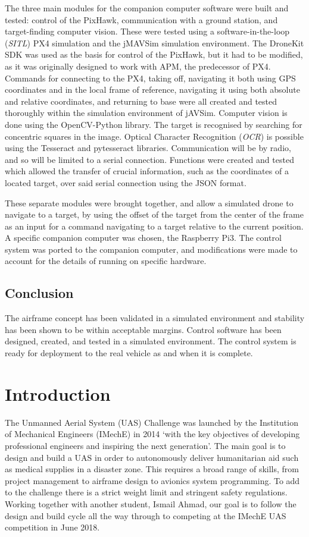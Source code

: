 \documentclass[11pt]{article}
\begin{document}
The three main modules for the companion computer software were built and tested: control of the PixHawk, communication with a ground station, and target-finding computer vision.
These were tested using a software-in-the-loop (\emph{SITL}) PX4 simulation and the jMAVSim simulation environment. The DroneKit SDK was used as the basis for control of the PixHawk, but it had to be modified, as it was originally designed to work with APM, the predecessor of PX4\cite{dronekit}. Commands for connecting to the PX4, taking off, navigating it both using GPS coordinates and in the local frame of reference, navigating it using both absolute and relative coordinates, and returning to base were all created and tested thoroughly within the simulation environment of jAVSim. Computer vision is done using the OpenCV-Python library. The target is recognised by searching for concentric squares in the image. Optical Character Recognition (\emph{OCR}) is possible using the Tesseract and pytesseract libraries. Communication will be by radio, and so will be limited to a serial connection. Functions were created and tested which allowed the transfer of crucial information, such as the coordinates of a located target, over said serial connection using the JSON format.

These separate modules were brought together, and allow a simulated drone to navigate to a target, by using the offset of the target from the center of the frame as an input for a command navigating to a target relative to the current position. A specific companion computer was chosen, the Raspberry Pi3. The control system was ported to the companion computer, and modifications were made to account for the details of running on specific hardware.

\subsection*{Conclusion}
The airframe concept has been validated in a simulated environment and stability has been shown to be within acceptable margins. Control software has been designed, created, and tested in a simulated environment. The control system is ready for deployment to the real vehicle as and when it is complete.


\section{Introduction}
The Unmanned Aerial System (UAS) Challenge was launched by the Institution of Mechanical Engineers (IMechE) in 2014 `with the key objectives of developing professional engineers and inspiring the next generation'\cite{IMechE_about_uas}. The main goal is to design and build a UAS in order to autonomously deliver humanitarian aid such as medical supplies in a disaster zone. This requires a broad range of skills, from project management to airframe design to avionics system programming. To add to the challenge there is a strict weight limit and stringent safety regulations. Working together with another student, Ismail Ahmad, our goal is to follow the design and build cycle all the way through to competing at the IMechE UAS competition in June 2018.
\end{document}
